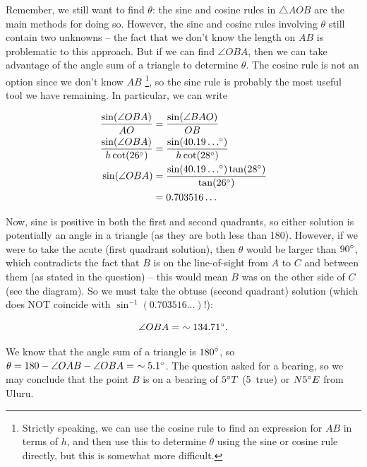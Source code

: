 \documentclass[a4paper,11pt]{article}
\begin{document}
\noindent Remember, we still want to find $\theta$: the sine and cosine rules in $\triangle AOB$ are the main methods for doing so. However, the sine and cosine rules involving $\theta$ still contain two unknowns -- the fact that we don't know the length on $AB$ is problematic to this approach. But if we can find $\angle OBA$, then we can take advantage of the angle sum of a triangle to determine $\theta$. The cosine rule is not an option since we don't know $AB$ \footnote{Strictly speaking, we can use the cosine rule to find an expression for $AB$ in terms of $h$, and then use this to determine $\theta$ using the sine or cosine rule directly, but this is somewhat more difficult.}, so the sine rule is probably the most useful tool we have remaining. In particular, we can write

\begin{align*}
\frac{\sin(\angle OBA)}{AO} &= \frac{\sin(\angle BAO)}{OB}\\
\frac{\sin(\angle OBA)}{h\cot(26\degree)} &= \frac{\sin(40.19\ldots \degree)}{h\cot(28\degree)}\\
\sin(\angle OBA) &= \frac{\sin(40.19\ldots\degree)\tan(28\degree)}{\tan(26\degree)}\\
&= 0.703516\ldots 
\end{align*}

\noindent Now, sine is positive in both the first and second quadrants, so either solution is potentially an angle in a triangle (as they are both less than 180\degree). However, if we were to take the acute (first quadrant solution), then $\theta$ would be larger than $90\degree$, which contradicts the fact that $B$ is on the line-of-sight from $A$ to $C$ and between them (as stated in the question) -- this would mean $B$ was on the other side of $C$ (see the diagram). So we must take the obtuse (second quadrant) solution (which does NOT coincide with $\sin^{-1}(0.703516\ldots)$!):

$$
\angle OBA =\ \sim 134.71\degree.
$$


\noindent We know that the angle sum of a triangle is $180\degree$, so $\theta = 180-\angle OAB - \angle OBA =\ \sim 5.1\degree$. The question asked for a bearing, so we may conclude that the point $B$ is on a bearing of $5\degree T$ (5\degree\ true) or $N5\degree E$ from Uluru.

\vspace{2cm}
\end{document}
